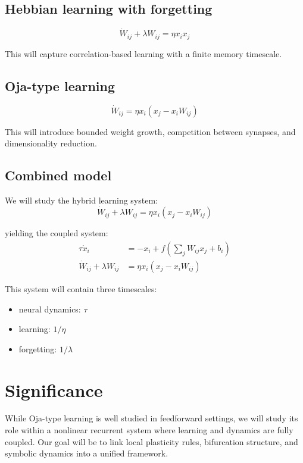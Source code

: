\documentclass{article}
\begin{document}
\subsection*{Hebbian learning with forgetting}
\begin{equation}
\dot{W}_{ij} + \lambda W_{ij} = \eta x_i x_j
\end{equation}

This will capture correlation-based learning with a finite memory timescale.

\subsection*{Oja-type learning}
\begin{equation}
\dot{W}_{ij} = \eta x_i (x_j - x_i W_{ij})
\end{equation}

This will introduce bounded weight growth, competition between synapses, and dimensionality reduction.

\subsection*{Combined model}

We will study the hybrid learning system:
\begin{equation}
\dot{W}_{ij} + \lambda W_{ij} = \eta x_i (x_j - x_i W_{ij})
\end{equation}

yielding the coupled system:
\begin{align}
\tau \dot{x}_i &= -x_i + f\!\left(\sum_j W_{ij} x_j + b_i\right) \\
\dot{W}_{ij} + \lambda W_{ij} &= \eta x_i (x_j - x_i W_{ij})
\end{align}

This system will contain three timescales:
\begin{itemize}
\item neural dynamics: $\tau$
\item learning: $1/\eta$
\item forgetting: $1/\lambda$
\end{itemize}

\section*{Significance}
While Oja-type learning is well studied in feedforward settings, we will study its role within a nonlinear recurrent system where learning and dynamics are fully coupled. Our goal will be to link local plasticity rules, bifurcation structure, and symbolic dynamics into a unified framework.
\end{document}
